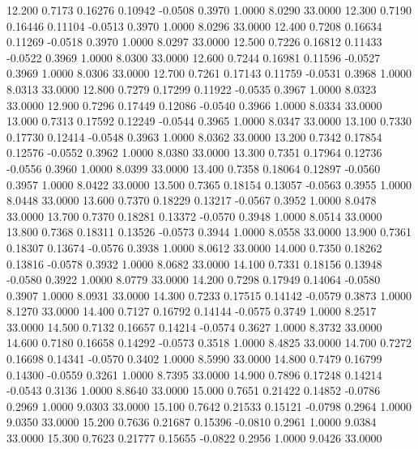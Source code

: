   12.200   0.7173   0.16276   0.10942  -0.0508   0.3970   1.0000   8.0290  33.0000
  12.300   0.7190   0.16446   0.11104  -0.0513   0.3970   1.0000   8.0296  33.0000
  12.400   0.7208   0.16634   0.11269  -0.0518   0.3970   1.0000   8.0297  33.0000
  12.500   0.7226   0.16812   0.11433  -0.0522   0.3969   1.0000   8.0300  33.0000
  12.600   0.7244   0.16981   0.11596  -0.0527   0.3969   1.0000   8.0306  33.0000
  12.700   0.7261   0.17143   0.11759  -0.0531   0.3968   1.0000   8.0313  33.0000
  12.800   0.7279   0.17299   0.11922  -0.0535   0.3967   1.0000   8.0323  33.0000
  12.900   0.7296   0.17449   0.12086  -0.0540   0.3966   1.0000   8.0334  33.0000
  13.000   0.7313   0.17592   0.12249  -0.0544   0.3965   1.0000   8.0347  33.0000
  13.100   0.7330   0.17730   0.12414  -0.0548   0.3963   1.0000   8.0362  33.0000
  13.200   0.7342   0.17854   0.12576  -0.0552   0.3962   1.0000   8.0380  33.0000
  13.300   0.7351   0.17964   0.12736  -0.0556   0.3960   1.0000   8.0399  33.0000
  13.400   0.7358   0.18064   0.12897  -0.0560   0.3957   1.0000   8.0422  33.0000
  13.500   0.7365   0.18154   0.13057  -0.0563   0.3955   1.0000   8.0448  33.0000
  13.600   0.7370   0.18229   0.13217  -0.0567   0.3952   1.0000   8.0478  33.0000
  13.700   0.7370   0.18281   0.13372  -0.0570   0.3948   1.0000   8.0514  33.0000
  13.800   0.7368   0.18311   0.13526  -0.0573   0.3944   1.0000   8.0558  33.0000
  13.900   0.7361   0.18307   0.13674  -0.0576   0.3938   1.0000   8.0612  33.0000
  14.000   0.7350   0.18262   0.13816  -0.0578   0.3932   1.0000   8.0682  33.0000
  14.100   0.7331   0.18156   0.13948  -0.0580   0.3922   1.0000   8.0779  33.0000
  14.200   0.7298   0.17949   0.14064  -0.0580   0.3907   1.0000   8.0931  33.0000
  14.300   0.7233   0.17515   0.14142  -0.0579   0.3873   1.0000   8.1270  33.0000
  14.400   0.7127   0.16792   0.14144  -0.0575   0.3749   1.0000   8.2517  33.0000
  14.500   0.7132   0.16657   0.14214  -0.0574   0.3627   1.0000   8.3732  33.0000
  14.600   0.7180   0.16658   0.14292  -0.0573   0.3518   1.0000   8.4825  33.0000
  14.700   0.7272   0.16698   0.14341  -0.0570   0.3402   1.0000   8.5990  33.0000
  14.800   0.7479   0.16799   0.14300  -0.0559   0.3261   1.0000   8.7395  33.0000
  14.900   0.7896   0.17248   0.14214  -0.0543   0.3136   1.0000   8.8640  33.0000
  15.000   0.7651   0.21422   0.14852  -0.0786   0.2969   1.0000   9.0303  33.0000
  15.100   0.7642   0.21533   0.15121  -0.0798   0.2964   1.0000   9.0350  33.0000
  15.200   0.7636   0.21687   0.15396  -0.0810   0.2961   1.0000   9.0384  33.0000
  15.300   0.7623   0.21777   0.15655  -0.0822   0.2956   1.0000   9.0426  33.0000
